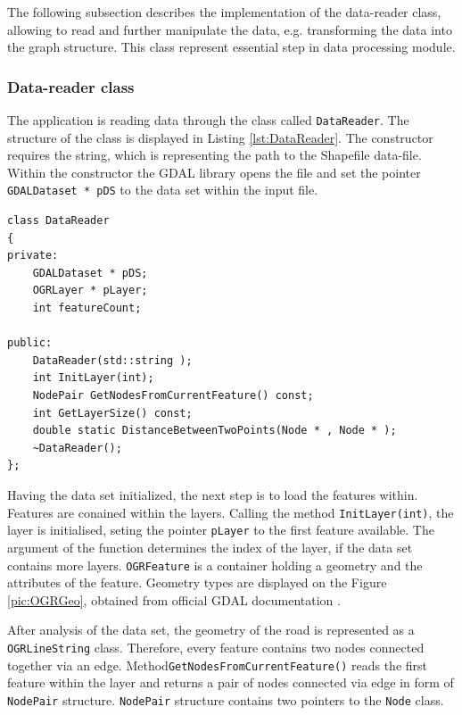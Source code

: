 \documentclass[thesis=M,english]{FITthesis}[2012/10/20]
\begin{document}
The following subsection describes the implementation of the data-reader class, allowing to read and further manipulate the data, e.g. transforming the data into the graph structure. This class represent essential step in data processing module.

\subsubsection{Data-reader class}

The application is reading data through the class called \texttt{DataReader}. The structure of the class is displayed in Listing \ref{lst:DataReader}. The constructor requires the string, which is representing the path to the Shapefile data-file. Within the constructor the GDAL library opens the file and set the pointer \texttt{GDALDataset * pDS} to the data set within the input file.

\begin{lstlisting}[frame=single, caption={\texttt{DataReader} class}, label={lst:DataReader}]
class DataReader
{
private:
    GDALDataset * pDS;
    OGRLayer * pLayer;
    int featureCount;

public:
    DataReader(std::string );
    int InitLayer(int);
    NodePair GetNodesFromCurrentFeature() const;
    int GetLayerSize() const;
    double static DistanceBetweenTwoPoints(Node * , Node * );
    ~DataReader();
};
\end{lstlisting}

Having the data set initialized, the next step is to load the features within. Features are conained within the layers. Calling the method \texttt{InitLayer(int)}, the layer is initialised, seting the pointer \texttt{pLayer} to the first feature available. The argument of the function determines the index of the layer, if the data set contains more layers. \texttt{OGRFeature} is a container holding a geometry and the attributes of the feature. Geometry types are displayed on the Figure \ref{pic:OGRGeo}, obtained from official GDAL documentation \cite{GDAL17}. 



After analysis of the data set, the geometry of the road is represented as a \texttt{OGRLineString} class. Therefore, every feature contains two nodes connected together via an edge. Method\texttt{GetNodesFromCurrentFeature()} reads the first feature within the layer and returns a pair of nodes connected via edge in form of \texttt{NodePair} structure. \texttt{NodePair} structure contains two pointers to the \texttt{Node} class. 
\end{document}
